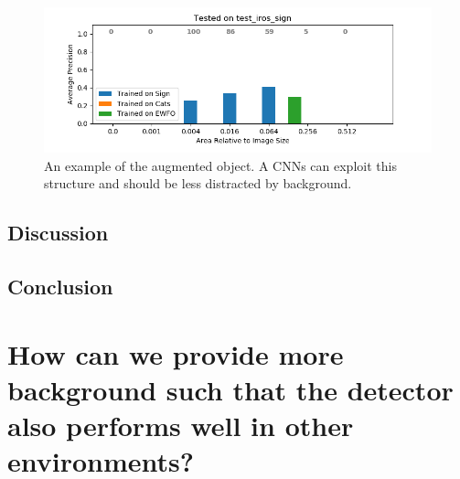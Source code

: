 \begin{figure}
	\includegraphics[width=\textwidth]{fig/basement_cats_size}
	\caption{An example of the augmented object. A \acp{CNN} can exploit this structure and should be less distracted by background.}
	\label{fig:basement_cats}
\end{figure}

\subsection{Discussion}

\subsection{Conclusion}

\section{How can we provide more background such that the detector also performs well in other environments?}

